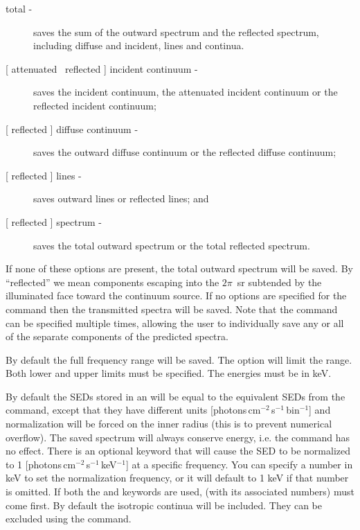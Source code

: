 \begin{description}
\item[total -] saves the sum of the outward spectrum and the reflected spectrum,
including diffuse and incident, lines and continua.

\item[{[ attenuated \textbar\ reflected ]} incident continuum -] saves the incident
continuum, the attenuated incident continuum or the reflected incident
continuum;

\item[{[ reflected ]} diffuse continuum -] saves the outward diffuse continuum
or the reflected diffuse continuum;

\item[{[ reflected ]} lines -] saves outward lines or reflected lines; and

\item[{[ reflected ]} spectrum -] saves the total outward spectrum or the total
reflected spectrum.
\end{description}

If none of these options are present, the total outward spectrum will be saved.
By ``reflected'' we mean components escaping into
the $2\pi$~sr subtended by the illuminated face toward the continuum source.
If no options are specified for the  command then the transmitted
spectra will be saved.  Note that the command can be specified multiple
times, allowing the user to individually save any or all of the separate
components of the predicted spectra.

By default the full frequency range will be saved.  The  option
will limit the range.  Both lower and upper limits must be specified.  The energies
must be in keV.

By default the SEDs stored in an  will be equal to the
equivalent SEDs from the  command, except that they
have different units [photons\,cm$^{-2}$\,s$^{-1}$\,bin$^{-1}$] and
normalization will be forced on the inner radius (this is to prevent numerical
overflow). The saved spectrum will always conserve energy, i.e. the
 command has no effect. There is an
optional keyword  that will cause the SED to be
normalized to 1 [photons\,cm$^{-2}$\,s$^{-1}$\,keV$^{-1}$] at a specific frequency. You can specify a number in keV to
set the normalization frequency, or it will default to 1 keV if that number is
omitted. If both the  and  keywords are
used,  (with its associated numbers) must come first. By
default the isotropic continua will be included. They can be excluded using
the  command.

